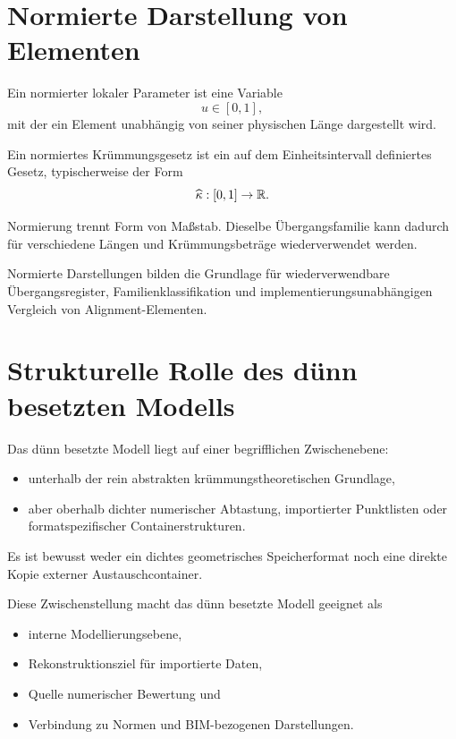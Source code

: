 \section{Normierte Darstellung von Elementen}

\begin{definition}
Ein normierter lokaler Parameter ist eine Variable
\[
u\in[0,1],
\]
mit der ein Element unabhängig von seiner physischen Länge dargestellt wird.
\end{definition}

\begin{definition}
Ein normiertes Krümmungsgesetz ist ein auf dem Einheitsintervall definiertes
Gesetz, typischerweise der Form
\[
\widehat{\kappa} : [0,1]\to\mathbb{R}.
\]
\end{definition}

Normierung trennt Form von Maßstab. Dieselbe Übergangsfamilie kann dadurch für
verschiedene Längen und Krümmungsbeträge wiederverwendet werden.

Normierte Darstellungen bilden die Grundlage für wiederverwendbare
Übergangsregister, Familienklassifikation und implementierungsunabhängigen
Vergleich von Alignment-Elementen.

\section{Strukturelle Rolle des dünn besetzten Modells}

Das dünn besetzte Modell liegt auf einer begrifflichen Zwischenebene:
\begin{itemize}
\item unterhalb der rein abstrakten krümmungstheoretischen Grundlage,
\item aber oberhalb dichter numerischer Abtastung, importierter Punktlisten
oder formatspezifischer Containerstrukturen.
\end{itemize}

Es ist bewusst weder ein dichtes geometrisches Speicherformat noch eine
direkte Kopie externer Austauschcontainer.

Diese Zwischenstellung macht das dünn besetzte Modell geeignet als
\begin{itemize}
\item interne Modellierungsebene,
\item Rekonstruktionsziel für importierte Daten,
\item Quelle numerischer Bewertung und
\item Verbindung zu Normen und BIM-bezogenen Darstellungen.
\end{itemize}

